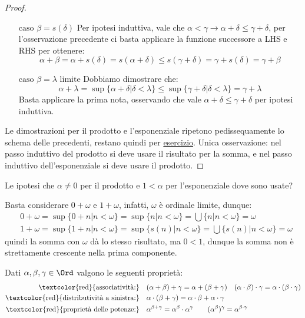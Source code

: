 \documentclass[11pt]{scrartcl}
\begin{document}
\begin{proof}
\begin{itemize}
		\item[$\boxed{\text{caso $\beta = s(\delta)$}}$] Per ipotesi induttiva, vale che $\alpha < \gamma \rightarrow \alpha + \delta \leq \gamma + \delta$, per l'osservazione precedente ci basta applicare la funzione successore a LHS e RHS per ottenere:
		\[ \alpha + \beta = \alpha + s(\delta) = s(\alpha + \delta) \leq s(\gamma + \delta) = \gamma + s(\delta) = \gamma + \beta
			\]
		\item[$\boxed{\text{caso $\beta = \lambda$ limite}}$] Dobbiamo dimostrare che:
		\[ \alpha + \lambda = \sup \{\alpha + \delta | \delta < \lambda\} \leq \sup\{\gamma + \delta | \delta < \lambda\} = \gamma + \lambda
			\]
		Basta applicare la prima nota, osservando che vale $\alpha + \delta \leq \gamma + \delta$ per ipotesi induttiva.
	\end{itemize}
	Le dimostrazioni per il prodotto e l'esponenziale ripetono pedissequamente lo schema delle precedenti, restano quindi per \underline{esercizio}. Unica osservazione:
	nel passo induttivo del prodotto si deve usare il risultato per la somma, e nel passo induttivo dell'esponenziale si deve usare il prodotto.
\end{proof}

\begin{exercise}
	Le ipotesi che $\alpha \ne 0$ per il prodotto e $1 < \alpha$ per l'esponenziale dove sono usate?
\end{exercise}

\begin{remark}
	Basta considerare $0 + \omega$ e $1 + \omega$, infatti, $\omega$ è ordinale limite, dunque:
	\begin{align*}
		& 0 + \omega = \sup \{0 + n | n < \omega\} = \sup \{n | n < \omega\} = \bigcup \{n | n < \omega\} = \omega \\
		& 1 + \omega = \sup \{1 + n | n < \omega\} = \sup \{s(n) | n < \omega\} = \bigcup \{s(n) | n < \omega\} = \omega
	\end{align*}
	quindi la somma con $\omega$ dà lo stesso risultato, ma $0 < 1$, dunque la somma non è strettamente crescente nella prima componente.
\end{remark}

\begin{proposition}
	Dati $\alpha,\beta,\gamma \in \Ord$ valgono le seguenti proprietà:
	\[\begin{split}
		\text{\textcolor{red}{associatività:}} &\quad (\alpha + \beta) + \gamma = \alpha + (\beta + \gamma) \quad (\alpha \cdot \beta) \cdot \gamma = \alpha \cdot (\beta \cdot \gamma)\\
		\text{\textcolor{red}{distributività a sinistra:}} &\quad  \alpha \cdot (\beta + \gamma) = \alpha \cdot \beta + \alpha \cdot \gamma \\
		\text{\textcolor{red}{proprietà delle potenze:}} &\quad {\alpha}^{\beta + \gamma} = \alpha^{\beta} \cdot \alpha^{\gamma} \qquad ({\alpha}^{\beta})^{\gamma} = {\alpha}^{\beta \cdot \gamma}
	\end{split}\]
\end{proposition}
\end{document}
